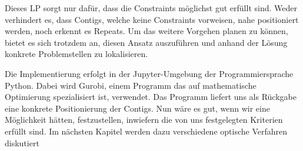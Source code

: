 Dieses LP sorgt nur dafür, dass die Constraints möglichst gut erfüllt sind. Weder verhindert es, dass Contigs, welche keine Constraints vorweisen, nahe positioniert werden, noch erkennt es Repeats. Um das weitere Vorgehen planen zu können, bietet es sich trotzdem an, diesen Ansatz auszuführen und anhand der Lösung konkrete Problemstellen zu lokalisieren. 


Die Implementierung erfolgt in der Jupyter-Umgebung der Programmiersprache Python. Dabei wird Gurobi, einem Programm das auf mathematische Optimierung spezialisiert ist, verwendet. Das Programm liefert uns als Rückgabe eine konkrete Positionierung der Contigs. Nun wäre es gut, wenn wir eine Möglichkeit hätten, festzustellen, inwiefern die von uns festgelegten Kriterien erfüllt sind. Im nächsten Kapitel werden dazu verschiedene optische Verfahren diskutiert




